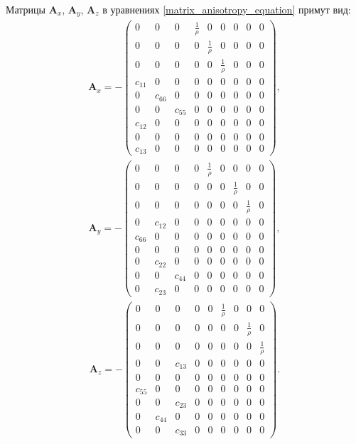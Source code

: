 	Матрицы $\mathbf{A}_x$, $\mathbf{A}_y$, $\mathbf{A}_z$ в уравнениях \eqref{matrix_anisotropy_equation} примут вид:
\begin{align}
\label{orthorombic_mat1}
\mathbf{A}_x = - 
\left( \begin{array}{cccccccccccc}
0 & 0 & 0 & \frac 1 \rho & 0 & 0 & 0 & 0 & 0 \\ 
0 & 0 & 0 & 0 & \frac 1 \rho & 0 & 0 & 0 & 0 \\ 
0 & 0 & 0 & 0 & 0 & \frac 1 \rho & 0 & 0 & 0 \\ 
c_{11} & 0 & 0 & 0 & 0 & 0 & 0 & 0 & 0 \\ 
0 & c_{66} & 0 & 0 & 0 & 0 & 0 & 0 & 0 \\
0 & 0 & c_{55} & 0 & 0 & 0 & 0 & 0 & 0 \\ 
c_{12} & 0 & 0 & 0 & 0 & 0 & 0 & 0 & 0 \\ 
0 & 0 & 0 & 0 & 0 & 0 & 0 & 0 & 0 \\ 
c_{13} & 0 & 0 & 0 & 0 & 0 & 0 & 0 & 0
\end{array} \right),
\end{align} 
\begin{align}
\label{orthorombic_mat2}
\mathbf{A}_y = - 
\left( \begin{array}{cccccccccccc}
0 & 0 & 0 & 0 & \frac 1 \rho & 0 & 0 & 0 & 0 \\ 
0 & 0 & 0 & 0 & 0 & 0 & \frac 1 \rho & 0 & 0 \\ 
0 & 0 & 0 & 0 & 0 & 0 & 0 & \frac 1 \rho & 0 \\ 
0 & c_{12} & 0 & 0 & 0 & 0 & 0 & 0 & 0 \\ 
c_{66} & 0 & 0 & 0 & 0 & 0 & 0 & 0 & 0 \\
0 & 0 & 0 & 0 & 0 & 0 & 0 & 0 & 0 \\
0 & c_{22} & 0 & 0 & 0 & 0 & 0 & 0 & 0 \\ 
0 & 0 & c_{44} & 0 & 0 & 0 & 0 & 0 & 0 \\
0 & c_{23} & 0 & 0 & 0 & 0 & 0 & 0 & 0   
\end{array} \right),
\end{align}
\begin{align}
\label{orthorombic_mat3}
\mathbf{A}_z = - 
\left( \begin{array}{cccccccccccc}
0 & 0 & 0 & 0 & 0 & \frac 1 \rho & 0 & 0 & 0 \\ 
0 & 0 & 0 & 0 & 0 & 0 & 0 & \frac 1 \rho & 0 \\ 
0 & 0 & 0 & 0 & 0 & 0 & 0 & 0 & \frac 1 \rho \\ 
0 & 0 & c_{13} & 0 & 0 & 0 & 0 & 0 & 0 \\ 
0 & 0 & 0 & 0 & 0 & 0 & 0 & 0 & 0 \\
c_{55} & 0 & 0 & 0 & 0 & 0 & 0 & 0 & 0 \\ 
0 & 0 & c_{23} & 0 & 0 & 0 & 0 & 0 & 0 \\ 
0 & c_{44} & 0 & 0 & 0 & 0 & 0 & 0 & 0 \\ 
0 & 0 & c_{33} & 0 & 0 & 0 & 0 & 0 & 0  
\end{array} \right).
\end{align}
	
